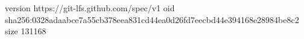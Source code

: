 version https://git-lfs.github.com/spec/v1
oid sha256:0328adaabce7a55cb378eea831cd44ea0d26fd7eecbd44e394168e28984be8c2
size 131168
